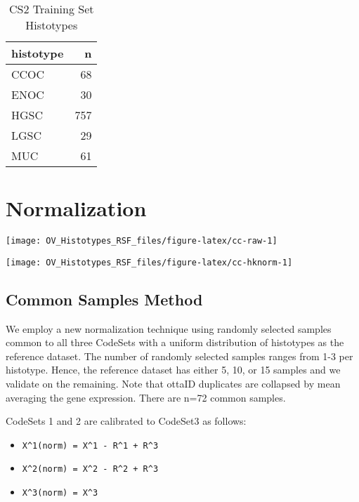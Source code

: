 \documentclass[
]{report}
\providecommand{\tightlist}{%
  \setlength{\itemsep}{0pt}\setlength{\parskip}{0pt}}
\begin{document}
\begin{table}

\caption{\label{tab:training-dist-cs2}CS2 Training Set Histotypes}
\centering
\begin{tabular}[t]{l|r}
\hline
histotype & n\\
\hline
CCOC & 68\\
\hline
ENOC & 30\\
\hline
HGSC & 757\\
\hline
LGSC & 29\\
\hline
MUC & 61\\
\hline
\end{tabular}
\end{table}

\hypertarget{normalization}{%
\section{Normalization}\label{normalization}}

\begin{center}\texttt{[image: OV\_Histotypes\_RSF\_files/figure-latex/cc-raw-1]} \end{center}

\begin{center}\texttt{[image: OV\_Histotypes\_RSF\_files/figure-latex/cc-hknorm-1]} \end{center}

\hypertarget{common-samples-method-1}{%
\subsection{Common Samples Method}\label{common-samples-method-1}}

We employ a new normalization technique using randomly selected samples common to all three CodeSets with a uniform distribution of histotypes as the reference dataset. The number of randomly selected samples ranges from 1-3 per histotype. Hence, the reference dataset has either 5, 10, or 15 samples and we validate on the remaining. Note that ottaID duplicates are collapsed by mean averaging the gene expression. There are n=72 common samples.

CodeSets 1 and 2 are calibrated to CodeSet3 as follows:

\begin{itemize}
\tightlist
\item
  \texttt{X\^{}1(norm)\ =\ X\^{}1\ -\ R\^{}1\ +\ R\^{}3}~\\
\item
  \texttt{X\^{}2(norm)\ =\ X\^{}2\ -\ R\^{}2\ +\ R\^{}3}~\\
\item
  \texttt{X\^{}3(norm)\ =\ X\^{}3}
\end{itemize}
\end{document}
